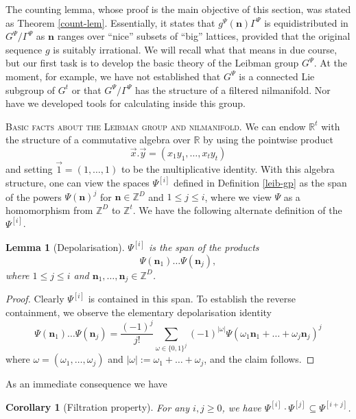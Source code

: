 \documentclass[11pt,reqno]{amsart}
\numberwithin{equation}{section}
\theoremstyle{plain}
\newtheorem{lemma}[subsection]{Lemma}
\newtheorem{corollary}[subsection]{Corollary}
\theoremstyle{definition}
\renewcommand{\leq}{\leqslant}
\renewcommand{\geq}{\geqslant}
\newcommand\Z{\mathbb{Z}}
\newcommand\R{\mathbb{R}}
\newcommand\1{{\bf 1}}
\newcommand\2{{\bf 2}}
\begin{document}
The counting lemma, whose proof is the main objective of this section, was stated as Theorem \ref{count-lem}. Essentially, it states that $g^{\Psi}(\mathbf{n})\Gamma^{\Psi}$ is equidistributed in $G^{\Psi}/\Gamma^{\Psi}$ as $\mathbf{n}$ ranges over ``nice'' subsets of ``big'' lattices, provided that the original sequence $g$ is suitably irrational. We will recall what that means in due course, but our first task is to develop the basic theory of the Leibman group $G^{\Psi}$. At the moment, for example, we have not established that $G^{\Psi}$ is a connected Lie subgroup of $G^t$ or that $G^{\Psi}/\Gamma^{\Psi}$ has the structure of a filtered nilmanifold. Nor have we developed tools for calculating inside this group.\vspace{11pt}

\textsc{Basic facts about the Leibman group and nilmanifold.} We can endow $\R^t$ with the structure of a commutative algebra over $\R$ by using the pointwise product
$$ \vec{x}.\vec{y} = (x_1 y_1,\ldots,x_t y_t)$$
and setting $\vec{1} = (1,\ldots,1)$ to be the multiplicative identity.
With this algebra structure, one can view the spaces ${\Psi}^{[i]}$ defined in Definition \ref{leib-gp} as the span of the powers $\Psi(\mathbf{n})^j$ for $\mathbf{n} \in \Z^D$ and $1 \leq j \leq i$, where we view $\Psi$ as a homomorphism from $\Z^D$ to $\Z^t$.  We have the following alternate definition of the ${\Psi}^{[i]}$.

\begin{lemma}[Depolarisation]\label{depol}  ${\Psi}^{[i]}$ is the span of the products \[ \Psi(\mathbf{n}_1) \ldots \Psi(\mathbf{n}_j),\] where $1 \leq j \leq i$ and $\mathbf{n}_1,\ldots,\mathbf{n}_j \in \Z^D$.
\end{lemma}
\begin{proof} Clearly ${\Psi}^{[i]}$ is contained in this span.  To establish the reverse containment, we observe the elementary depolarisation identity
$$ \Psi(\mathbf{n}_1) \ldots \Psi(\mathbf{n}_j) = \frac{(-1)^j}{j!} \sum_{\omega \in \{0,1\}^j} (-1)^{|\omega|} \Psi(\omega_1 \mathbf{n}_1 + \ldots + \omega_j \mathbf{n}_j)^j$$
where $\omega = (\omega_1,\ldots,\omega_j)$ and $|\omega| := \omega_1+\ldots+\omega_j$, and the claim follows.
\end{proof}

As an immediate consequence we have

\begin{corollary}[Filtration property]\label{filtr}  For any $i,j \geq 0$, we have $\Psi^{[i]} \cdot \Psi^{[j]} \subseteq \Psi^{[i+j]}$.
\end{corollary}
\end{document}
